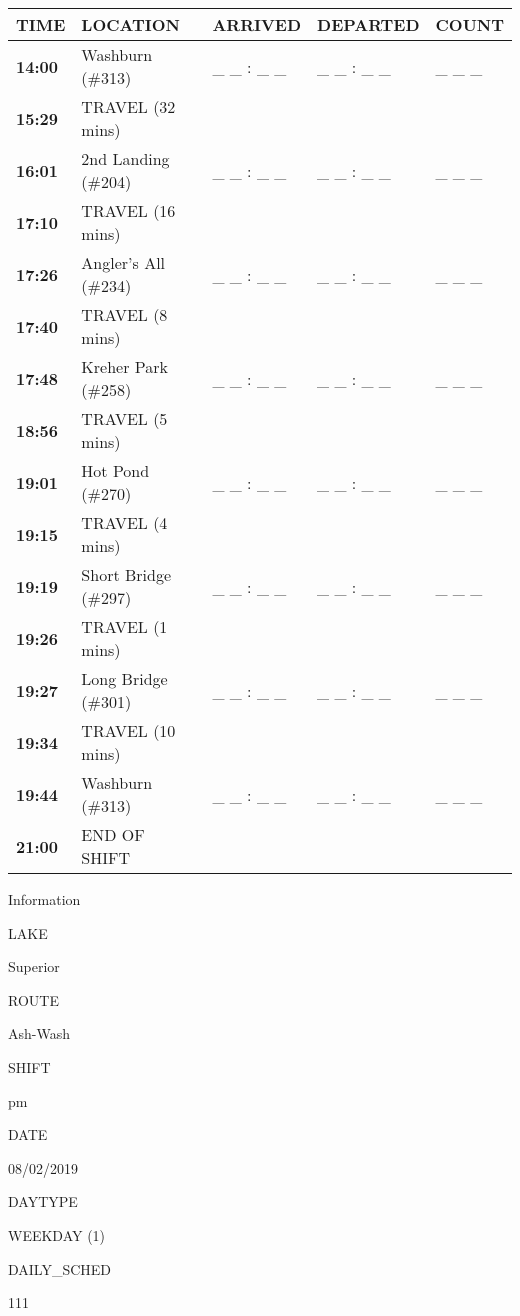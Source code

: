 \documentclass[]{article}
\begin{document}
\begin{tabular}{>{\bfseries}lllll}
\toprule
\textbf{TIME} & \textbf{LOCATION} & \textbf{ARRIVED} & \textbf{DEPARTED} & \textbf{COUNT}\\
\midrule
14:00 & Washburn (\#313) & \_ \_ : \_ \_ & \_ \_ : \_ \_ & \_ \_ \_\\
15:29 & TRAVEL (32 mins) &  &  & \\
16:01 & 2nd Landing (\#204) & \_ \_ : \_ \_ & \_ \_ : \_ \_ & \_ \_ \_\\
17:10 & TRAVEL (16 mins) &  &  & \\
17:26 & Angler's All (\#234) & \_ \_ : \_ \_ & \_ \_ : \_ \_ & \_ \_ \_\\
17:40 & TRAVEL (8 mins) &  &  & \\
17:48 & Kreher Park (\#258) & \_ \_ : \_ \_ & \_ \_ : \_ \_ & \_ \_ \_\\
18:56 & TRAVEL (5 mins) &  &  & \\
19:01 & Hot Pond (\#270) & \_ \_ : \_ \_ & \_ \_ : \_ \_ & \_ \_ \_\\
19:15 & TRAVEL (4 mins) &  &  & \\
19:19 & Short Bridge (\#297) & \_ \_ : \_ \_ & \_ \_ : \_ \_ & \_ \_ \_\\
19:26 & TRAVEL (1 mins) &  &  & \\
19:27 & Long Bridge (\#301) & \_ \_ : \_ \_ & \_ \_ : \_ \_ & \_ \_ \_\\
19:34 & TRAVEL (10 mins) &  &  & \\
19:44 & Washburn (\#313) & \_ \_ : \_ \_ & \_ \_ : \_ \_ & \_ \_ \_\\
21:00 & END OF SHIFT &  &  & \\
\bottomrule
\end{tabular}\newpage

Information

LAKE

Superior

ROUTE

Ash-Wash

SHIFT

pm

DATE

08/02/2019

DAYTYPE

WEEKDAY (1)

DAILY\_SCHED

111

\vspace{24pt}
\end{document}
